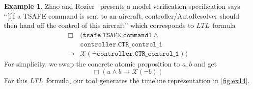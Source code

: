 \documentclass[conference]{IEEEtran}
\theoremstyle{definition}
\newtheorem{example}{Example}[section]
\theoremstyle{remark}
\newcommand{\always}{\Box}
\newcommand{\nextt}{\mathcal{X}}
\newcommand{\limplies}{\rightarrow}
\newcommand{\ltl}{\textit{LTL}}
\newcommand{\tand}{\land}
\newcommand{\tor}{\lor}
\newcommand{\tnot}{\lnot}
\begin{document}
\begin{example} \label{example:air}
    Zhao and Rozier~\cite{ZR14} presents a model verification specification says ``[i]f a TSAFE command is sent to an aircraft, controller/AutoResolver should then hand off the control of this aircraft'' which corresponds to \ltl\ formula
    \begin{align*}
        \always & (\texttt{tsafe.TSAFE\_command1} \land  \\ & \texttt{controller.CTR\_control\_1} \\
        \limplies & \nextt (\neg \texttt{controller.CTR\_control\_1}))
    \end{align*}
    For simplicity, we swap the concrete atomic proposition to $a,b$ and get
    \[
        \always (a \land b \limplies \nextt (\neg b))
    \]
    For this \ltl\ formula, our tool generates the timeline representation in \cref{fig:ex14}.
    \begin{figure}[h!]
        \centering
        \resizebox{\textwidth}{!}{
}
\end{figure}
\end{example}
\end{document}
